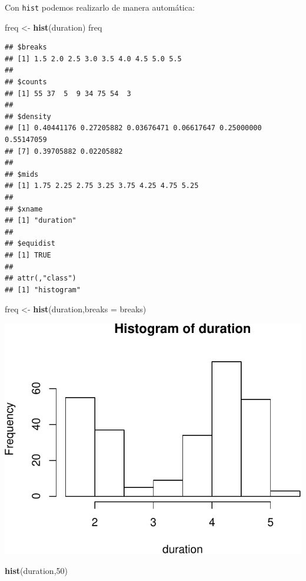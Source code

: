 \documentclass[]{article}
\newenvironment{Shaded}{\begin{snugshade}}{\end{snugshade}}
\newcommand{\KeywordTok}[1]{\textcolor[rgb]{0.13,0.29,0.53}{\textbf{{#1}}}}
\newcommand{\DataTypeTok}[1]{\textcolor[rgb]{0.13,0.29,0.53}{{#1}}}
\newcommand{\DecValTok}[1]{\textcolor[rgb]{0.00,0.00,0.81}{{#1}}}
\newcommand{\StringTok}[1]{\textcolor[rgb]{0.31,0.60,0.02}{{#1}}}
\newcommand{\NormalTok}[1]{{#1}}
\numberwithin{equation}{section}
\begin{document}
Con \texttt{hist} podemos realizarlo de manera automática:

\begin{Shaded}
\begin{Highlighting}[]
\NormalTok{freq <-}\StringTok{ }\KeywordTok{hist}\NormalTok{(duration)}
\NormalTok{freq}
\end{Highlighting}
\end{Shaded}

\begin{verbatim}
## $breaks
## [1] 1.5 2.0 2.5 3.0 3.5 4.0 4.5 5.0 5.5
## 
## $counts
## [1] 55 37  5  9 34 75 54  3
## 
## $density
## [1] 0.40441176 0.27205882 0.03676471 0.06617647 0.25000000 0.55147059
## [7] 0.39705882 0.02205882
## 
## $mids
## [1] 1.75 2.25 2.75 3.25 3.75 4.25 4.75 5.25
## 
## $xname
## [1] "duration"
## 
## $equidist
## [1] TRUE
## 
## attr(,"class")
## [1] "histogram"
\end{verbatim}

\begin{Shaded}
\begin{Highlighting}[]
\NormalTok{freq <-}\StringTok{ }\KeywordTok{hist}\NormalTok{(duration,}\DataTypeTok{breaks =} \NormalTok{breaks)}
\end{Highlighting}
\end{Shaded}

\includegraphics{tema1_files/figure-latex/unnamed-chunk-107-1.pdf}

\begin{Shaded}
\begin{Highlighting}[]
\KeywordTok{hist}\NormalTok{(duration,}\DecValTok{50}\NormalTok{)}
\end{Highlighting}
\end{Shaded}
\end{document}
